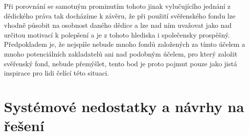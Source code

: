 \documentclass{article}
\begin{document}
Při porovnání se samotným prominutím tohoto jinak vylučujícího jednání z dědického práva tak docházíme k závěru, že při použití svěřenského fondu lze vhodně působit na osobnost daného dědice a lze nad ním uvažovat jako nad určitou motivací k polepšení a je z tohoto hlediska i společensky prospěšný. Předpokladem je, že nejspíše nebude mnoho fondů založených za tímto účelem a mnoho potenciálních zakladatelů ani nad podobným účelem, pro který založit svěřenský fond, nebude přemýšlet, tento bod je proto pojmut pouze jako jistá inspirace pro lidi čelící této situaci.\\

\newpage


\section{Systémové nedostatky a návrhy na řešení}








\end{document}
